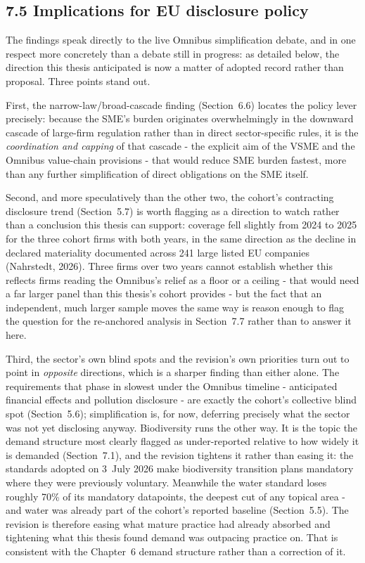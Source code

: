 \documentclass[
]{article}
\begin{document}
\subsection{7.5 Implications for EU disclosure
policy}\label{discussion-policy}

The findings speak directly to the live Omnibus simplification debate, and
in one respect more concretely than a debate still in progress: as detailed
below, the direction this thesis anticipated is now a matter of adopted
record rather than proposal. Three points stand out.

First, the narrow-law/broad-cascade finding (Section~6.6)
locates the policy lever precisely: because the SME's burden originates
overwhelmingly in the downward cascade of large-firm regulation rather than in
direct sector-specific rules, it is the \emph{coordination and capping} of
that cascade - the explicit aim of the VSME and the Omnibus value-chain
provisions - that would reduce SME burden fastest, more than any further
simplification of direct obligations on the SME itself.

Second, and more speculatively than the other two, the cohort's contracting
disclosure trend (Section~5.7) is worth flagging as a
direction to watch rather than a conclusion this thesis can support: coverage
fell slightly from 2024 to 2025 for the three cohort firms with both years,
in the same direction as the decline in declared materiality documented
across 241 large listed EU companies (Nahrstedt, 2026). Three firms over two years cannot establish whether
this reflects firms reading the Omnibus's relief as a floor or a ceiling - that would need a far larger panel than this thesis's cohort provides - but
the fact that an independent, much larger sample moves the same way is reason
enough to flag the question for the re-anchored analysis in Section~7.7
rather than to answer it here.

Third, the sector's own blind spots and the revision's own priorities turn
out to point in \emph{opposite} directions, which is a sharper finding than
either alone. The requirements that phase in slowest under the Omnibus
timeline - anticipated financial effects and pollution disclosure - are
exactly the cohort's collective blind spot (Section~5.6); simplification
is, for now, deferring precisely what the sector was not yet disclosing
anyway. Biodiversity runs the other way. It is the topic the demand structure
most clearly flagged as under-reported relative to how widely it is demanded
(Section~7.1), and the revision tightens it rather than easing it: the standards
adopted on 3~July 2026 make biodiversity transition plans mandatory where they
were previously voluntary. Meanwhile the water standard loses roughly 70\% of its
mandatory datapoints, the deepest cut of any topical area - and water was already
part of the cohort's reported baseline (Section~5.5). The revision is
therefore easing what mature practice had already absorbed and tightening what
this thesis found demand was outpacing practice on. That is consistent with the
Chapter~6 demand structure rather than a correction of it.
\end{document}
